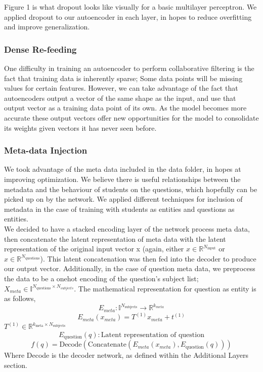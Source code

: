 \documentclass{article}
\begin{document}
Figure 1 is what dropout looks like visually for a basic multilayer perceptron. We applied dropout to our autoencoder in each layer, in hopes to reduce overfitting and improve generalization.
\subsubsection{Dense Re-feeding}
One difficulty in training an autoencoder to perform collaborative filtering is the fact that training data is inherently sparse; Some data points will be missing values for certain features. However, we can take advantage of the fact that autoencoders output a vector of the same shape as the input, and use that output vector as a training data point of its own. As the model becomes more accurate these output vectors offer new opportunities for the model to consolidate its weights given vectors it has never seen before. 
\subsubsection{Meta-data Injection}
We took advantage of the meta data included in the data folder, in hopes at improving optimization. We believe there is useful relationships between the metadata and the behaviour of students on the questions, which hopefully can be picked up on by the network. We applied different techniques for inclusion of metadata in the case of training with students as entities and questions as entities.\\
We decided to have a stacked encoding layer of the network process meta data, then concatenate the latent representation of meta data with the latent representation of the original input vector x (again, either $x \in \mathbb{R}^{N_{\text{input}}}$ or $x \in \mathbb{R}^{N_{\text{questions}}}$). This latent concatenation was then fed into the decoder to produce our output vector. Additionally, in the case of question meta data, we preprocess the data to be a onehot encoding of the question's subject list; $X_{meta} \in \mathbb{I}^{N_{\text{questions}}\times N_{subjects}}$. The mathematical representation for question as entity is as follows,
$$E_{meta}: \mathbb{I}^{N_{\text{subjects}}} \rightarrow \mathbb{R}^{k_{meta}}$$
$$E_{meta}(x_{meta}) = T^{(1)}x_{meta} + t^{(1)}$$
$T^{(1)} \in \mathbb{R}^{k_{\text{meta}} \times N_{\text{subjects}}}$
$$E_{\text{question}}(q): \text{Latent representation of question}$$
$$f(q) = \text{Decode}(\text{Concatenate}(E_{meta}(x_{meta}), E_{\text{question}}(q)))$$
Where Decode is the decoder network, as defined within the Additional Layers section.
\end{document}
